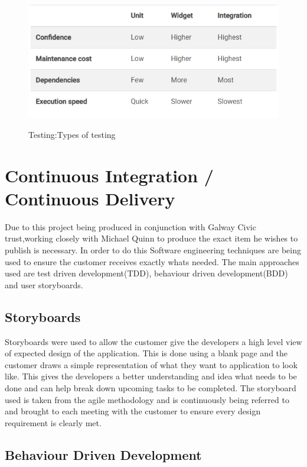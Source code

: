 \begin{figure}[ht!]
    \centering
 \includegraphics[width=125mm,scale=0.5]{img/Capture.PNG}
\caption{Testing:Types of testing}
\cite{testing}
\label{fig:method}
\end{figure}

\section {Continuous Integration / Continuous Delivery}

Due to this project being produced in conjunction with Galway Civic trust,working closely with Michael Quinn to produce the exact item he wishes to publish is necessary. In order to do this Software engineering techniques are being used to ensure the customer receives exactly whats needed. The main approaches used are test driven development(TDD), behaviour driven development(BDD) and user storyboards.

\subsection{Storyboards}

Storyboards were used to allow the customer give the developers a high level view of expected design of the application. This is done using a blank page and the customer draws a simple representation of what they want to application to look like. This gives the developers a better understanding and idea what needs to be done and can help break down upcoming tasks to be completed. The storyboard used is taken from the agile methodology and is continuously being referred to and brought to each meeting with the customer to ensure every design requirement is clearly met. \cite{StoryBoard}

\subsection{Behaviour Driven Development}

